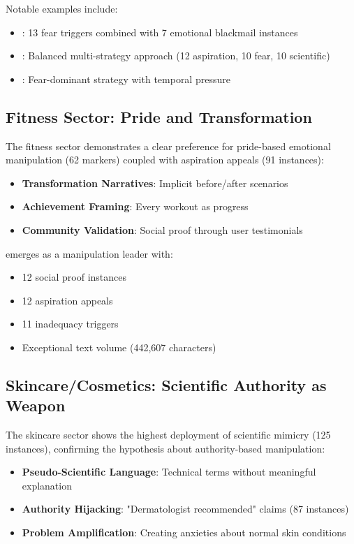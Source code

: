 Notable examples include:
\begin{itemize}
    \item {}: 13 fear triggers combined with 7 emotional blackmail instances
    \item {}: Balanced multi-strategy approach (12 aspiration, 10 fear, 10 scientific)
    \item {}: Fear-dominant strategy with temporal pressure
\end{itemize}

\subsection{Fitness Sector: Pride and Transformation}

The fitness sector demonstrates a clear preference for pride-based emotional manipulation (62 markers) coupled with aspiration appeals (91 instances):

\begin{itemize}
    \item \textbf{Transformation Narratives}: Implicit before/after scenarios
    \item \textbf{Achievement Framing}: Every workout as progress
    \item \textbf{Community Validation}: Social proof through user testimonials
\end{itemize}

 emerges as a manipulation leader with:
\begin{itemize}
    \item 12 social proof instances
    \item 12 aspiration appeals
    \item 11 inadequacy triggers
    \item Exceptional text volume (442,607 characters)
\end{itemize}

\subsection{Skincare/Cosmetics: Scientific Authority as Weapon}

The skincare sector shows the highest deployment of scientific mimicry (125 instances), confirming the hypothesis about authority-based manipulation:

\begin{itemize}
    \item \textbf{Pseudo-Scientific Language}: Technical terms without meaningful explanation
    \item \textbf{Authority Hijacking}: "Dermatologist recommended" claims (87 instances)
    \item \textbf{Problem Amplification}: Creating anxieties about normal skin conditions
\end{itemize}

